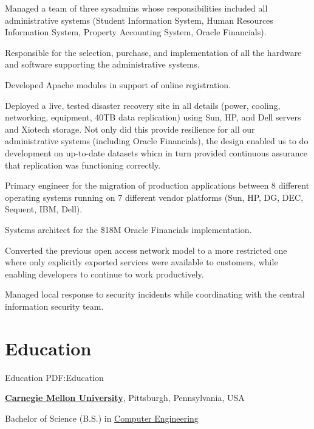 \documentclass[letterpaper,10pt,oneside]{article}
\begin{document}
\begin{body}
\begin{detail}

\BulletItem
Managed a team of three sysadmins whose responsibilities included all
administrative systems (Student Information System, Human Resources
Information System, Property Accounting System, Oracle Financials).

\BulletItem
Responsible for the selection, purchase, and implementation of all the
hardware and software supporting the administrative systems.

\BulletItem
Developed Apache modules in support of online registration.

\BulletItem
Deployed a live, tested disaster recovery site in all details (power,
cooling, networking, equipment, 40TB data replication) using Sun, HP, and Dell
servers and Xiotech storage.  Not only did this provide resilience for all
our administrative systems (including Oracle Financials), the design
enabled us to do development on up-to-date datasets whicn in turn provided
continuous assurance that replication was functioning correctly.

\BulletItem
Primary engineer for the migration of production applications between 8
different operating systems running on 7 different vendor platforms (Sun,
HP, DG, DEC, Sequent, IBM, Dell).

\BulletItem
Systems architect for the \$18M Oracle Financials implementation.

\BulletItem
Converted the previous open access network model to a more restricted one
where only explicitly exported services were available to customers, while
enabling developers to continue to work productively.

\BulletItem
Managed local response to security incidents while coordinating with the
central information security team.

\end{detail}
\EntryGap



\section
{Education}
{Education}
{PDF:Education}

\href{http://www.cmu.edu/}
{\textbf{Carnegie Mellon University}},
Pittsburgh, Pennsylvania, USA
\par
Bachelor of Science (B.S.) in
\href{http://www.ece.cmu.edu/}
{Computer Engineering}
\hfill


\end{body}
\end{document}
